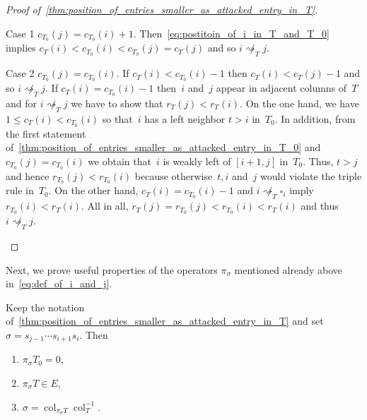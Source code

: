 \documentclass[ALCO,ThmDefs,Unicode,epreuves]{cedram}
\newcommand{\fs}{s}
\newcommand{\col}{\operatorname{col}}
\newcommand{\att}{\rightsquigarrow}
\newcommand{\natt}{\not \rightsquigarrow}
\newcommand{\cell}{\square}
\begin{document}
\begin{proof}[Proof of~\cref{thm:position_of_entries_smaller_as_attacked_entry_in_T}]
\begin{enonce*}[remark]{Case 1} $c_{T_0}(j)=c_{T_0}(i)+1$. Then~\eqref{eq:postitoin_of_i_in_T_and_T_0} implies $c_T(i) < c_{T_0}(i)< c_{T_0}(j) = c_T(j)$ and so $i\not \att_T j$. 
\end{enonce*}

\begin{enonce*}[remark]{Case 2} $c_{T_0}(j)=c_{T_0}(i)$. If $c_T(i) < c_{T_0}(i)-1$ then $c_T(i) < c_T(j)-1$ and so $i\natt_T j$. If $c_T(i) = c_{T_0}(i)-1$ then~$i$ and~$j$ appear in adjacent columns of~$T$ and for $i\natt_T j$ we have to show that $r_T(j) < r_T(i)$.
	 On the one hand, we have $1\leq c_T(i) <c_{T_0}(i)$ so that~$i$ has a left neighbor $t>i$ in~$T_0$.
	 In addition, from the first statement of~\cref{thm:position_of_entries_smaller_as_attacked_entry_in_T_0} and $c_{T_0}(j)=c_{T_0}(i)$ we obtain that~$i$ is weakly left of $[i+1,j]$ in~$T_0$.
	 Thus, $t>j$ and hence $r_{T_0}(j) < r_{T_0}(i)$ because otherwise~$t,i$ and~$j$ would violate the triple rule in~$T_0$.
	 On the other hand, $c_T(i) = c_{T_0}(i)-1$ and $i\not \att_T \cell_i$ imply $r_{T_0}(i) < r_T(i)$. All in all, $r_{T}(j) = r_{T_0}(j) < r_{T_0}(i) < r_T(i)$ and thus $i \not \att_T j$.\qedhere
\end{enonce*}
\end{proof}

Next, we prove useful properties of the operators $\pi_\sigma$ mentioned already above in~\eqref{eq:def_of_i_and_j}.

\begin{lemma}
	\label{thm:end:annihilator_for_T_0}
	Keep the notation of~\cref{thm:position_of_entries_smaller_as_attacked_entry_in_T} and set $\sigma = \fs_{j-1} \cdots \fs_{i+1} \fs_i$. Then
	\begin{enumerate}
		\item\label{lemma4.9_1} $\pi_\sigma T_0 = 0$,
		\item\label{lemma4.9_2} $\pi_\sigma T \in E$,
		\item\label{lemma4.9_3} $\sigma = \col_{\pi_\sigma T} \col^{-1}_{T}$.
	\end{enumerate}
\end{lemma}
\end{document}
